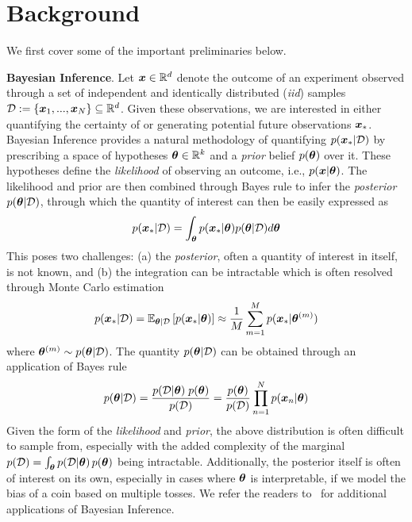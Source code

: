
\vspace{-3mm}
\section{Background}
\label{sec:prelim}
\vspace{-2mm}
We first cover some of the important preliminaries below.

\textbf{Bayesian Inference}. Let ${\bm{x}} \in \mathbb{R}^d$ denote the outcome of an experiment observed through a set of independent and identically distributed (\textit{iid}) samples ${\mathcal{D}} := \{{\bm{x}}_1, ..., {\bm{x}}_N\} \subseteq \mathbb{R}^d$. Given these observations, we are interested in either quantifying the certainty of or generating potential future observations ${\bm{x}}_*$. Bayesian Inference provides a natural methodology of quantifying $p({\bm{x}}_* | {\mathcal{D}})$ by prescribing a space of hypotheses ${\bm{\theta}} \in \mathbb{R}^k$ and a \textit{prior} belief $p({\bm{\theta}})$ over it. These hypotheses define the \textit{likelihood} of observing an outcome, i.e., $p({\bm{x}} | {\bm{\theta}})$. The likelihood and prior are then combined through Bayes rule to infer the \textit{posterior} $p({\bm{\theta}} | {\mathcal{D}})$, through which the quantity of interest can then be easily expressed as 
\begin{align}
    p({\bm{x}}_* | {\mathcal{D}}) = \int_{\bm{\theta}} p({\bm{x}}_* | {\bm{\theta}}) p({\bm{\theta}} | {\mathcal{D}}) d{\bm{\theta}}
\end{align}
This poses two challenges: (a) the \textit{posterior}, often a quantity of interest in itself, is not known, and (b) the integration can be intractable which is often resolved through Monte Carlo estimation
\begin{align}
    p({\bm{x}}_* | {\mathcal{D}}) = \mathbb{E}_{{\bm{\theta}} | {\mathcal{D}}} \left[p({\bm{x}}_* | {\bm{\theta}})\right]
    \approx \frac{1}{M} \sum_{m=1}^M p({\bm{x}}_* | {\bm{\theta}}^{(m)})
\end{align}
where ${\bm{\theta}}^{(m)} \sim p({\bm{\theta}} | {\mathcal{D}})$. The quantity $p({\bm{\theta}} | {\mathcal{D}})$ can be obtained through an application of Bayes rule
\begin{align}
    \label{eq:bayes_rule}
    p({\bm{\theta}} | {\mathcal{D}}) = \frac{p({\mathcal{D}} | {\bm{\theta}})\;p({\bm{\theta}})}{p({\mathcal{D}})} 
    = \frac{p({\bm{\theta}})}{p({\mathcal{D}})} \prod_{n=1}^N p({\bm{x}}_n | {\bm{\theta}})
\end{align}
Given the form of the \textit{likelihood} and \textit{prior}, the above distribution is often difficult to sample from, especially with the added complexity of the marginal $p({\mathcal{D}}) = \int_{\bm{\theta}} p({\mathcal{D}} | {\bm{\theta}})\, p({\bm{\theta}})$ being intractable. Additionally, the posterior itself is often of interest on its own, especially in cases where ${\bm{\theta}}$ is interpretable, \eg if we model the bias of a coin based on multiple tosses. We refer the readers to~\citet{bishop2006pattern} for additional applications of Bayesian Inference.

